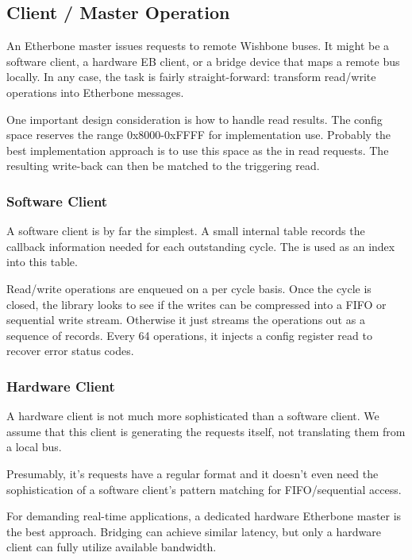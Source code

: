 \documentclass{article}
\begin{document}
\subsection{Client / Master Operation}
\label{sec:eb-master}

An Etherbone master issues requests to remote Wishbone buses.
It might be a software client,
a hardware EB client,
or a bridge device that maps a remote bus locally.
In any case, the task is fairly straight-forward:
transform read/write operations into Etherbone messages.

One important design consideration is how to handle read results.
The config space reserves the range 0x8000-0xFFFF for implementation use.
Probably the best implementation approach is to use this space as the
 in read requests.
The resulting write-back can then be matched to the triggering read.

\subsubsection{Software Client}

A software client is by far the simplest.
A small internal table records the 
callback information needed for each outstanding cycle.
The  is used as an index into this table.

Read/write operations are enqueued on a per cycle basis.
Once the cycle is closed,
the library looks to see if the writes can be compressed into a FIFO or
sequential write stream.
Otherwise it just streams the operations out as a sequence of records.
Every 64 operations, 
it injects a config register read to recover error status codes.

\subsubsection{Hardware Client}

A hardware client is not much more sophisticated than a software client.
We assume that this client is generating the requests itself,
not translating them from a local bus.

Presumably, 
it's requests have a regular format 
and it doesn't even need the sophistication of 
a software client's pattern matching for FIFO/sequential access.

For demanding real-time applications,
a dedicated hardware Etherbone master is the best approach.
Bridging can achieve similar latency,
but only a hardware client can fully utilize available bandwidth.
\end{document}
